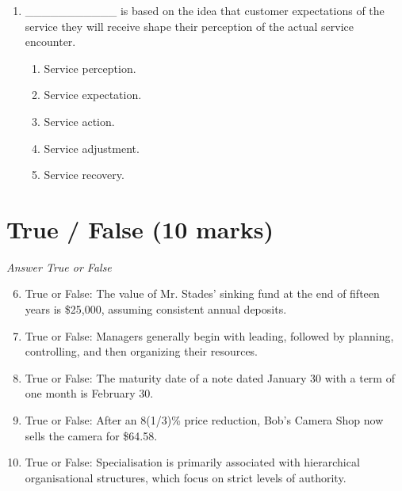\documentclass[12pt]{article}
\begin{document}
\begin{enumerate}[label=\arabic*.]
\begin{enumerate}[label=(\alph*)]
    \item 72.8
    \item 65.9
    \item 85.0
    \item 70.3
    \item 83.7
\end{enumerate}
\item \_\_\_\_\_\_\_\_\_\_\_ is based on the idea that customer expectations of the service they will receive shape their perception of the actual service encounter.
\begin{enumerate}[label=(\alph*)]
    \item Service perception.
    \item Service expectation.
    \item Service action.
    \item Service adjustment.
    \item Service recovery.
\end{enumerate}
\end{enumerate}

\section*{True / False (10 marks)}
\textit{Answer True or False}
\begin{enumerate}[label=\arabic*.]
\setcounter{enumi}{5}
\item True or False: The value of Mr. Stades' sinking fund at the end of fifteen years is \$25,000, assuming consistent annual deposits.
\item True or False: Managers generally begin with leading, followed by planning, controlling, and then organizing their resources.
\item True or False: The maturity date of a note dated January 30 with a term of one month is February 30.
\item True or False: After an 8(1/3)\% price reduction, Bob's Camera Shop now sells the camera for \$64.58.
\item True or False: Specialisation is primarily associated with hierarchical organisational structures, which focus on strict levels of authority.
\end{enumerate}
\end{document}
